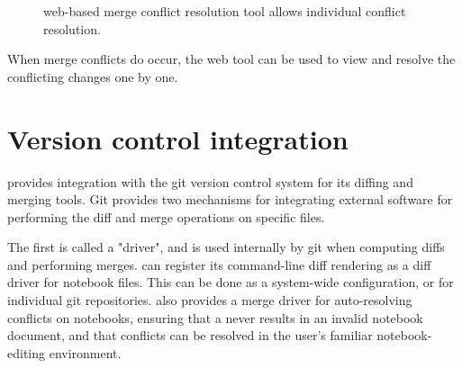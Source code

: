 \documentclass{deliverablereport}
\begin{document}
\begin{figure}
    \center
    \caption{\nbmerge web-based merge conflict resolution tool allows individual conflict resolution.}
    \label{fig:nbmerge-web}
\end{figure}

When merge conflicts do occur, the \nbmerge web tool can be used to view and resolve the conflicting changes one by one.



\section{Version control integration} %
\label{sub:version_control_integration}

\nbdime provides integration with the git version control system for its diffing and merging tools.
Git provides two mechanisms for integrating external software for
performing the diff and merge operations on specific files.

The first is called a "driver", and is used internally by git when computing diffs and performing merges. \nbdime can register its command-line diff rendering as a diff driver for notebook files.
This can be done as a system-wide configuration, or for individual git repositories.
\nbdime also provides a merge driver for auto-resolving conflicts on notebooks,
ensuring that a  never results in an invalid notebook document,
and that conflicts can be resolved in the user's familiar notebook-editing environment.
\end{document}
